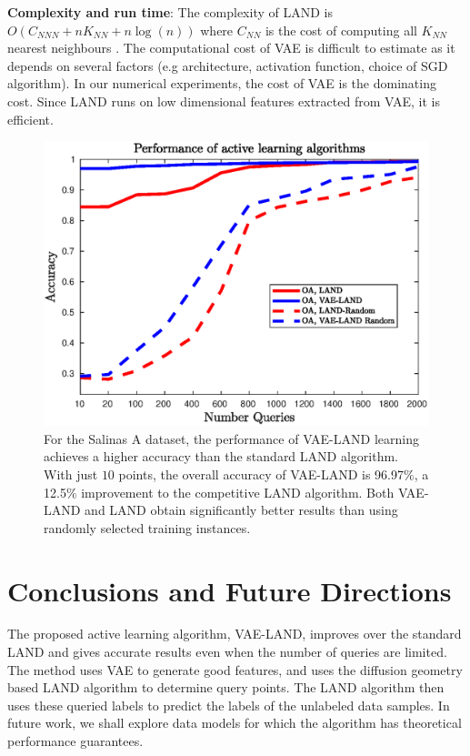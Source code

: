 \documentclass{article}
\begin{document}
\noindent \textbf{Complexity and run time}: The complexity of LAND is $O(C_{NNN}+nK_{NN}+n\log(n))$ where $C_{NN}$ is the cost of computing all $K_{NN}$ nearest neighbours \cite{Maggioni2019_LAND}. 
The computational cost of VAE is difficult to estimate as it depends on several factors (e.g architecture, activation function, choice of SGD algorithm). In our numerical experiments, the cost of VAE is the dominating cost. Since LAND runs on low dimensional features extracted from VAE, it is efficient. 

\begin{figure}
    \includegraphics[width=.45\textwidth]{Images/salinasa_results_improved.eps}
    \caption{For the Salinas A dataset, the performance of VAE-LAND learning achieves a higher accuracy than the standard LAND algorithm. With just $10$ points, the overall accuracy of VAE-LAND is 96.97\%, a 12.5\% improvement to the competitive LAND algorithm. Both VAE-LAND and LAND obtain significantly better results than using randomly selected training instances. }
    \label{fig:my_label}
\end{figure}


\section{Conclusions and Future Directions}
\label{sec:Conclusions}
The proposed active learning algorithm, VAE-LAND, improves over the standard LAND and gives accurate results even when the number of queries are limited. The method uses VAE to generate good features, and uses the diffusion geometry based LAND algorithm to determine query points. The LAND algorithm then uses these queried labels to predict the labels of the unlabeled data samples. In future work, we shall explore data models for which the algorithm has theoretical performance guarantees.   




\end{document}
